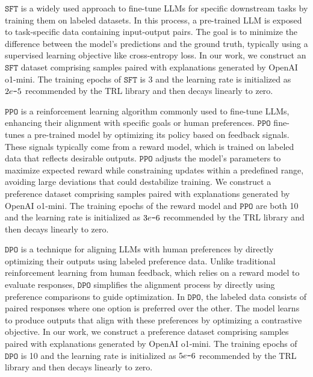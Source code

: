 \textbf{$\mathtt{SFT}$} is a widely used approach to fine-tune LLMs for specific downstream tasks by training them on labeled datasets. In this process, a pre-trained LLM is exposed to task-specific data containing input-output pairs. The goal is to minimize the difference between the model’s predictions and the ground truth, typically using a supervised learning objective like cross-entropy loss. In our work, we construct an $\mathtt{SFT}$ dataset comprising samples paired with explanations generated by OpenAI o1-mini. The training epochs of $\mathtt{SFT}$ is 3 and the learning rate is initialized as $2e\textup{\texttt{-}} 5$ recommended by the TRL library and then decays linearly to zero.


\textbf{$\mathtt{PPO}$} is a reinforcement learning algorithm commonly used to fine-tune LLMs, enhancing their alignment with specific goals or human preferences. $\mathtt{PPO}$ fine-tunes a pre-trained model by optimizing its policy based on feedback signals. These signals typically come from a reward model, which is trained on labeled data that reflects desirable outputs. $\mathtt{PPO}$ adjusts the model’s parameters to maximize expected reward while constraining updates within a predefined range, avoiding large deviations that could destabilize training. We construct a preference dataset comprising samples paired with explanations generated by OpenAI o1-mini. The training epochs of the reward model and $\mathtt{PPO}$ are both 10 and the learning rate is initialized as $3e\textup{\texttt{-}} 6$ recommended by the TRL library and then decays linearly to zero.



\textbf{$\mathtt{DPO}$} is a technique for aligning LLMs with human preferences by directly optimizing their outputs using labeled preference data. 
Unlike traditional reinforcement learning from human feedback, which relies on a reward model to evaluate responses, $\mathtt{DPO}$ simplifies the alignment process by directly using preference comparisons to guide optimization. In $\mathtt{DPO}$, the labeled data consists of paired responses where one option is preferred over the other. The model learns to produce outputs that align with these preferences by optimizing a contrastive objective. In our work, we construct a preference dataset comprising samples paired with explanations generated by OpenAI o1-mini. The training epochs of $\mathtt{DPO}$ is 10 and the learning rate is initialized as $5e\textup{\texttt{-}} 6$ recommended by the TRL library and then decays linearly to zero.


